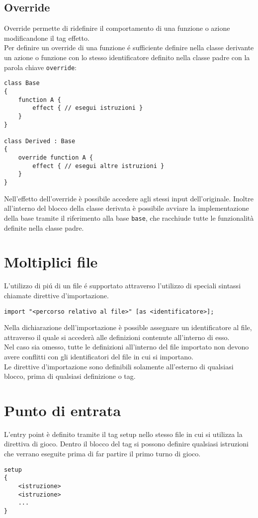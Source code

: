 \subsection{Override}
Override permette di ridefinire il comportamento di una funzione o azione modificandone
il tag effetto. \\ 
Per definire un override di una funzione é sufficiente definire nella classe derivante
un azione o funzione con lo stesso identificatore definito nella classe padre con la 
parola chiave \lstinline|override|:
\begin{lstlisting}
class Base 
{
    function A { 
        effect { // esegui istruzioni } 
    }
}

class Derived : Base
{
    override function A { 
        effect { // esegui altre istruzioni }
    }
}
\end{lstlisting}
Nell'effetto dell'override è possibile accedere agli stessi input dell'originale. 
Inoltre all'interno del blocco della classe derivata è possibile avviare la implementazione 
della base tramite il riferimento alla base \lstinline|base|, che racchiude
tutte le funzionalità definite nella classe padre. 

\section{Moltiplici file} \label{MultipleFiles}
L'utilizzo di piú di un file é supportato attraverso l'utilizzo di speciali sintassi
chiamate direttive d'importazione. 
\begin{lstlisting}
import "<percorso relativo al file>" [as <identificatore>];
\end{lstlisting}
Nella dichiarazione dell'importazione è possible assegnare un identificatore al file, 
attraverso il quale si accederà alle definizioni contenute all'interno di esso. \\
Nel caso sia omesso, tutte le definizioni all'interno del file importato non devono avere
conflitti con gli identificatori del file in cui si importano. \\
Le direttive d'importazione sono definibili solamente all'esterno di qualsiasi blocco,
prima di qualsiasi definizione o tag. 

\section{Punto di entrata}
L'entry point è definito tramite il tag setup nello stesso file in cui 
si utilizza la direttiva di gioco. 
\newpage
Dentro il blocco del tag si possono definire qualsiasi istruzioni che verrano eseguite
prima di far partire il primo turno di gioco.
\begin{lstlisting}
setup 
{
    <istruzione>
    <istruzione>
    ...
}
\end{lstlisting}

